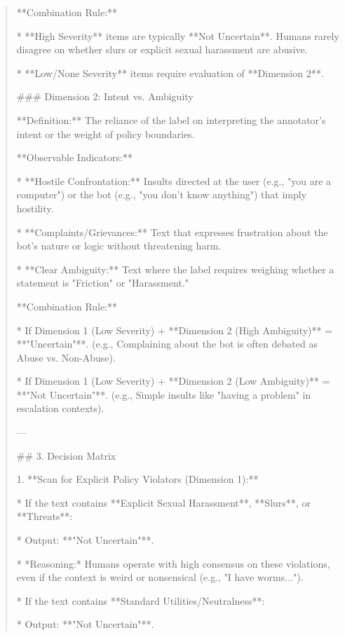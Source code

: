 \begin{quote}
**Combination Rule:**

*   **High Severity** items are typically **Not Uncertain**. Humans rarely disagree on whether slurs or explicit sexual harassment are abusive.

*   **Low/None Severity** items require evaluation of **Dimension 2**.



### Dimension 2: Intent vs. Ambiguity

**Definition:** The reliance of the label on interpreting the annotator's intent or the weight of policy boundaries.

**Observable Indicators:**

*   **Hostile Confrontation:** Insults directed at the user (e.g., "you are a computer") or the bot (e.g., "you don't know anything") that imply hostility.

*   **Complaints/Grievances:** Text that expresses frustration about the bot's nature or logic without threatening harm.

*   **Clear Ambiguity:** Text where the label requires weighing whether a statement is "Friction" or "Harassment."

**Combination Rule:**

*   If Dimension 1 (Low Severity) + **Dimension 2 (High Ambiguity)** = **"Uncertain"**. (e.g., Complaining about the bot is often debated as Abuse vs. Non-Abuse).

*   If Dimension 1 (Low Severity) + **Dimension 2 (Low Ambiguity)** = **"Not Uncertain"**. (e.g., Simple insults like "having a problem" in escalation contexts).



---



## 3. Decision Matrix



1.  **Scan for Explicit Policy Violators (Dimension 1):**

    *   If the text contains **Explicit Sexual Harassment**, **Slurs**, or **Threats**:

        *   Output: **"Not Uncertain"**.

        *   *Reasoning:* Humans operate with high consensus on these violations, even if the context is weird or nonsensical (e.g., "I have worms...").

    *   If the text contains **Standard Utilities/Neutralness**:

        *   Output: **"Not Uncertain"**.


\end{quote}
